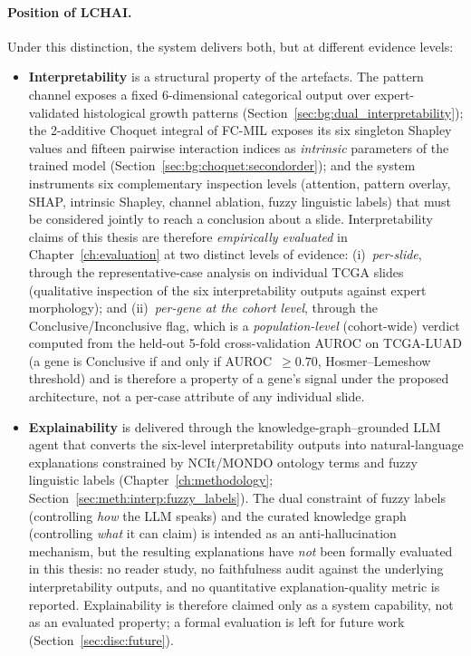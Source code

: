 \paragraph{Position of LCHAI.}
Under this distinction, the system delivers both, but at different
evidence levels:
\begin{itemize}
    \item \textbf{Interpretability} is a structural property of
    the artefacts.
    The pattern channel exposes a fixed 6-dimensional categorical
    output over expert-validated histological growth patterns
    (Section~\ref{sec:bg:dual_interpretability}); the 2-additive
    Choquet integral of FC-MIL exposes its six singleton Shapley
    values and fifteen pairwise interaction indices as
    \emph{intrinsic} parameters of the trained model
    (Section~\ref{sec:bg:choquet:secondorder}); and the system
    instruments six complementary inspection levels (attention,
    pattern overlay, SHAP, intrinsic Shapley, channel ablation,
    fuzzy linguistic labels) that must be considered jointly to
    reach a conclusion about a slide.
    Interpretability claims of this thesis are therefore
    \emph{empirically evaluated} in
    Chapter~\ref{ch:evaluation} at two distinct levels of evidence:
    (i)~\emph{per-slide}, through the representative-case
    analysis on individual TCGA slides (qualitative inspection of
    the six interpretability outputs against expert morphology); and
    (ii)~\emph{per-gene at the cohort level}, through the
    Conclusive/Inconclusive flag, which is a
    \emph{population-level} (cohort-wide) verdict computed from the
    held-out 5-fold cross-validation AUROC on TCGA-LUAD
    (a gene is Conclusive if and only if AUROC~$\geq 0.70$,
    Hosmer--Lemeshow threshold)
    and is therefore a property of a gene's signal under the
    proposed architecture, not a per-case attribute of any
    individual slide.
    \item \textbf{Explainability} is delivered through the
    knowledge-graph--grounded LLM agent that converts the
    six-level interpretability outputs into natural-language
    explanations constrained by NCIt/MONDO ontology terms and
    fuzzy linguistic labels (Chapter~\ref{ch:methodology};
    Section~\ref{sec:meth:interp:fuzzy_labels}).
    The dual constraint of fuzzy labels (controlling
    \emph{how} the LLM speaks) and the curated knowledge graph
    (controlling \emph{what} it can claim) is intended as an
    anti-hallucination mechanism, but the resulting explanations
    have \emph{not} been formally evaluated in this thesis: no
    reader study, no faithfulness audit against the underlying
    interpretability outputs, and no quantitative explanation-quality
    metric is reported.
    Explainability is therefore claimed only as a
    system capability, not as an evaluated property; a
    formal evaluation is left for future work
    (Section~\ref{sec:disc:future}).
\end{itemize}

